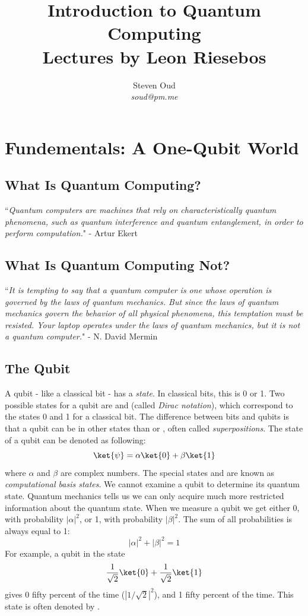 \documentclass[11pt]{article}
\title{\textbf{Introduction to Quantum Computing \\
\large Lectures by Leon Riesebos}}
\author{Steven Oud \\ \emph{soud@pm.me}}
\begin{document}
\vfill
\maketitle

\tableofcontents

\newpage

\section{Fundementals: A One-Qubit World}
\subsection{What Is Quantum Computing?}
``\emph{Quantum computers are machines that rely on characteristically quantum phenomena, such as quantum interference and quantum entanglement, in order to perform computation.}" - Artur Ekert

\subsection{What Is Quantum Computing Not?}
``\emph{It is tempting to say that a quantum computer is one whose operation is governed by the laws of quantum mechanics. But since the laws of quantum mechanics govern the behavior of all physical phenomena, this temptation must be resisted. Your laptop operates under the laws of quantum mechanics, but it is not a quantum computer.}" - N. David Mermin

\subsection{The Qubit}
A qubit - like a classical bit - has a \emph{state}. In classical bits, this is 0 or 1. Two possible states for a qubit are  and  (called \emph{Dirac notation}), which correspond to the states 0 and 1 for a classical bit. The difference between bits and qubits is that a qubit can be in other states than  or , often called \emph{superpositions}. The state of a qubit can be denoted as following:
\[\ket{\psi} = \alpha\ket{0} + \beta\ket{1}\]
where $\alpha$ and $\beta$ are complex numbers. The special states  and  are known as \emph{computational basis states}. We cannot examine a qubit to determine its quantum state. Quantum mechanics tells us we can only acquire much more restricted information about the quantum state. When we measure a qubit we get either 0, with probability $|\alpha|^2$, or 1, with probability $|\beta|^2$. The sum of all probabilities is always equal to 1:
\[|\alpha|^2 + |\beta|^2 = 1\]
For example, a qubit in the state
\[
\dfrac{1}{\sqrt2}\ket{0}+\dfrac{1}{\sqrt2}\ket{1}
\]
gives 0 fifty percent of the time ($|1/\sqrt2|^2$), and 1 fifty percent of the time. This state is often denoted by \ket{+}.
\newpage
\end{document}
